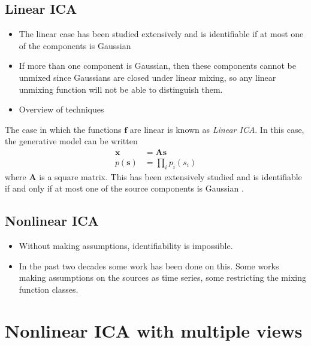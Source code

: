 \subsection{Linear ICA}

\begin{itemize}
	\item The linear case has been studied extensively and is identifiable if at most one of the components is Gaussian
	\item If more than one component is Gaussian, then these components cannot be unmixed since Gaussians are closed under linear mixing, so any linear unmixing function will not be able to distinguish them.
	\item Overview of techniques
\end{itemize}


The case in which the functions $\bm{f}$ are linear is known as \emph{Linear ICA}. 
In this case, the generative model can be written
\begin{align*}
\bm{x} &= \bm{A}\bm{s} \\
p(\bm{s}) &= \prod_{i} p_i(s_i)
\end{align*}
where $\bm{A}$ is a square matrix.
This has been extensively studied and is identifiable if and only if at most one of the source components is Gaussian \cite{cite}.



\subsection{Nonlinear ICA}

\begin{itemize}
	\item Without making assumptions, identifiability is impossible.
	\item In the past two decades some work has been done on this. Some works making assumptions on the sources as time series, some restricting the mixing function classes.
\end{itemize}

\section{Nonlinear ICA with multiple views}
